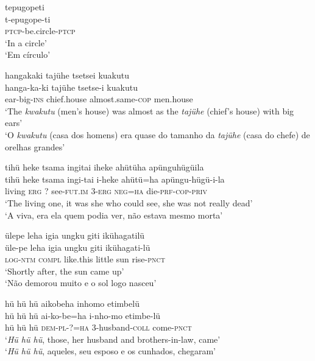 \documentclass[output=paper,
modfonts,nonflat
]{langsci/langscibook}
\begin{document}
\ea tepugopeti \\[.3em]
\gll t-epugope-ti \\
\textsc{ptcp}-be.circle-\textsc{ptcp} \\
\glt ‘In a circle’ \\
‘Em círculo’ \\
\z

\ea hangakaki tajühe tsetsei kuakutu \\[.3em]
\gll hanga-ka-ki tajühe tsetse-i kuakutu \\
ear-big-\textsc{ins} chief.house almost.same-\textsc{cop} men.house \\
\glt ‘The \emph{kwakutu} (men’s house) was almost as the \emph{tajühe} (chief’s house) with big ears’ \\
‘O \emph{kwakutu} (casa dos homens) era quase do tamanho da \emph{tajühe} (casa do chefe) de orelhas grandes’ \\
\z

\newpage 
\ea tihü heke tsama ingitai iheke ahütüha apünguhügüila \\[.3em]
\gll tihü	heke 	tsama	ingi-tai		i-heke	ahütü=ha	apüngu-hügü-i-la \\
living 	\textsc{erg} 	? 	see-\textsc{fut.im} 	3-\textsc{erg}	\textsc{neg=ha} 	die-\textsc{prf-cop-priv} \\
\glt ‘The living one, it was she who could see, she was not really dead’ \\
‘A viva, era ela quem podia ver, não estava mesmo morta’ \\
\z

\ea ülepe leha igia ungku giti ikühagatilü \\[.3em]
\gll üle-pe		leha		igia	ungku	giti	ikühagati-lü \\
\textsc{log-ntm} 	\textsc{compl}	like.this little 	sun 	rise-\textsc{pnct} \\
\glt ‘Shortly after, the sun came up’ \\
‘Não demorou muito e o sol logo nasceu’ \\
\z

\ea hü hü hü{\footnotemark}{} aikobeha inhomo etimbelü \\[.3em]
\gll hü hü hü 	ai-ko-be=ha		i-nho-mo{\footnotemark}{} 		etimbe-lü \\
hü hü hü	\textsc{dem-pl-?=ha} 	3-husband-\textsc{coll} 	come-\textsc{pnct} \\
\glt ‘\textit{Hü hü hü}, those, her husband and brothers-in-law, came’ \\
‘\textit{Hü hü hü}, aqueles, seu esposo e os cunhados, chegaram’ \\
\addtocounter{footnote}{-1}
\z
\end{document}

